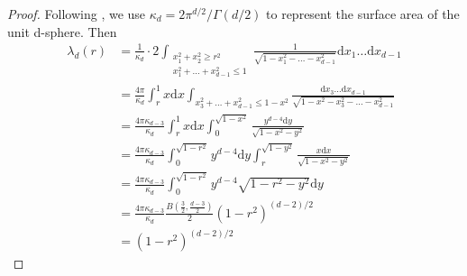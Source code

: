 \documentclass{aptpub}
\def\d{\mathrm{d}}
\begin{document}
\begin{proof}
     Following \cite{dwyer1991convex}, we use $\kappa_d = 2\pi^{d/2}/\Gamma(d/2)$
     to represent the surface area of the unit d-sphere. Then
     \begin{align*}
          \lambda_d(r) &=\frac{1}{\kappa_d} 
          \cdot 2\int_{\substack{x_1^2+x_2^2\geq r^2\\
          x_1^2+\dots+x_{d-1}^2\leq 1 }} 
          \frac{1}{\sqrt{1-x_1^2-\dots -x_{d-1}^2}} \d x_1 \dots \d x_{d-1}\\
      &= \frac{4\pi}{\kappa_d} \int_r^1 x\d x \int_{x_3^2+\dots + x_{d-1}^2 \leq 1-x^2} \frac{\d x_3\dots \d x_{d-1}}
      {\sqrt{1-x^2-x_3^2-\dots -x_{d-1}^2}} \\
      &=\frac{4\pi \kappa_{d-3}}{\kappa_d} \int_r^1 x\d x \int_0^{\sqrt{1-x^2}} \frac{y^{d-4}\d y}{\sqrt{1-x^2-y^2}}\\
      &=\frac{4\pi \kappa_{d-3}}{\kappa_d} \int_0^{\sqrt{1-r^2}} y^{d-4}\d y \int_r^{\sqrt{1-y^2}} \frac{x\d x}{\sqrt{1-x^2-y^2}}\\
      &=\frac{4\pi \kappa_{d-3}}{\kappa_d} \int_0^{\sqrt{1-r^2}} y^{d-4}\sqrt{1-r^2-y^2} \d y\\
      &=\frac{4\pi \kappa_{d-3}}{\kappa_d}  \frac{B(\frac{3}{2 }, \frac{d-3}{2})}{2}(1-r^2)^{(d-2)/2}\\
      &=  (1-r^2)^{(d-2)/2}
      \end{align*}
\end{proof}
\end{document}
